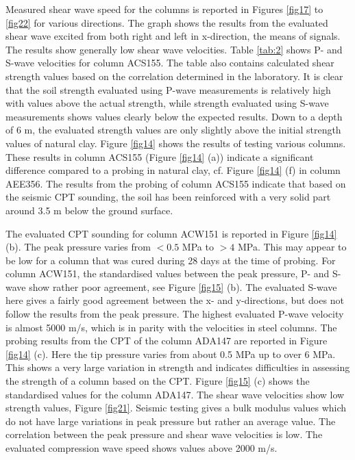 \documentclass[final,3p,times,onecolumn,authoryear]{elsarticle}
\begin{document}
Measured shear wave speed for the columns is reported in Figures \ref{fig17} to \ref{fig22} for various directions. The graph shows the results from the evaluated shear wave excited from both right and left in x-direction, the means of signals. The results show generally low shear wave velocities. Table \ref{tab:2} shows P- and S-wave velocities for column ACS155. The table also contains calculated shear strength values based on the correlation determined in the laboratory. It is clear that the soil strength evaluated using P-wave measurements is relatively high with values above the actual strength, while strength evaluated using S-wave measurements shows values clearly below the expected results. Down to a depth of 6 m, the evaluated strength values are only slightly above the initial strength values of natural clay. Figure \ref{fig14} shows the results of testing various columns. These results in column ACS155 (Figure \ref{fig14} (a)) indicate a significant difference compared to a probing in natural clay, cf. Figure \ref{fig14} (f) in column AEE356. The results from the probing of column ACS155 indicate that based on the seismic CPT sounding, the soil has been reinforced with a very solid part around 3.5 m below the ground surface.

The evaluated CPT sounding for column ACW151 is reported in Figure \ref{fig14} (b). The peak pressure varies from $<0.5$ MPa to $>4$ MPa. This may appear to be low for a column that was cured during 28 days at the time of probing. For column ACW151, the standardised values between the peak pressure, P- and S-wave show rather poor agreement, see Figure \ref{fig15} (b). The evaluated S-wave here gives a fairly good agreement between the x- and y-directions, but does not follow the results from the peak pressure. The highest evaluated P-wave velocity is almost 5000 m/s, which is in parity with the velocities in steel columns. The probing results from the CPT of the column ADA147 are reported in Figure \ref{fig14} (c). Here the tip pressure varies from about 0.5 MPa up to over 6 MPa. This shows a very large variation in strength and indicates difficulties in assessing the strength of a column based on the CPT. Figure \ref{fig15} (c) shows the standardised values for the column ADA147. The shear wave velocities show low strength values, Figure \ref{fig21}. Seismic testing gives a bulk modulus values which do not have large variations in peak pressure but rather an average value. The correlation between the peak pressure and shear wave velocities is low. The evaluated compression wave speed shows values above 2000 m/s.
\end{document}
